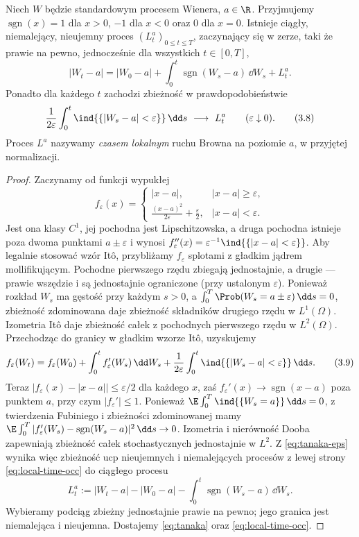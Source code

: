 \begin{twierdzenie}
\label{th:tanaka}
Niech $W$ będzie standardowym procesem Wienera, $a\in\R$.
Przyjmujemy $\operatorname{sgn}(x)=1$ dla $x>0$,
$-1$ dla $x<0$ oraz $0$ dla $x=0$. Istnieje ciągły,
niemalejący, nieujemny proces $(L_t^a)_{0\le t\le T}$,
zaczynający się w zerze, taki że prawie na pewno,
jednocześnie dla wszystkich $t\in[0,T]$,
\[
|W_t-a|=|W_0-a|+\int_0^t\operatorname{sgn}(W_s-a)
\,\dd W_s+L_t^a.
\tag{3.7}\label{eq:tanaka}
\]
Ponadto dla każdego $t$ zachodzi zbieżność w
prawdopodobieństwie
\[
\frac1{2\varepsilon}\int_0^t
\ind{\{|W_s-a|<\varepsilon\}}\,\dd s
\ \longrightarrow\ L_t^a
\qquad(\varepsilon\downarrow0).
\tag{3.8}\label{eq:local-time-occ}
\]
Proces $L^a$ nazywamy \emph{czasem lokalnym} ruchu Browna
na poziomie $a$, w przyjętej normalizacji.
\end{twierdzenie}
\begin{proof}
Zaczynamy od funkcji wypukłej
\[
f_\varepsilon(x)=
\begin{cases}
|x-a|,&|x-a|\ge\varepsilon,\\
\displaystyle\frac{(x-a)^2}{2\varepsilon}+
\frac\varepsilon2,&|x-a|<\varepsilon.
\end{cases}
\]
Jest ona klasy $C^1$, jej pochodna jest Lipschitzowska,
a druga pochodna istnieje poza dwoma punktami
$a\pm\varepsilon$ i wynosi
$f_\varepsilon''(x)=\varepsilon^{-1}
\ind{\{|x-a|<\varepsilon\}}$.
Aby legalnie stosować wzór Itô, przybliżamy
$f_\varepsilon$ splotami z gładkim jądrem
mollifikującym. Pochodne pierwszego rzędu zbiegają
jednostajnie, a drugie — prawie wszędzie i są
jednostajnie ograniczone (przy ustalonym
$\varepsilon$). Ponieważ rozkład $W_s$ ma gęstość
przy każdym $s>0$, a $\int_0^T\Prob(W_s=a\pm\varepsilon)
\,\dd s=0$, zbieżność zdominowana daje
zbieżność składników drugiego rzędu w $L^1(\Omega)$.
Izometria Itô daje zbieżność całek z pochodnych
pierwszego rzędu w $L^2(\Omega)$.
Przechodząc do granicy w gładkim wzorze Itô, uzyskujemy
\[
f_\varepsilon(W_t)=f_\varepsilon(W_0)
+\int_0^t f_\varepsilon'(W_s)\,\dd W_s
+\frac1{2\varepsilon}\int_0^t
\ind{\{|W_s-a|<\varepsilon\}}\,\dd s.
\tag{3.9}\label{eq:tanaka-eps}
\]
Teraz $|f_\varepsilon(x)-|x-a||\le\varepsilon/2$ dla
każdego $x$, zaś $f_\varepsilon'(x)\to
\operatorname{sgn}(x-a)$ poza punktem $a$, przy czym
$|f_\varepsilon'|\le1$. Ponieważ
$\E\int_0^T\ind{\{W_s=a\}}\,\dd s=0$,
z twierdzenia Fubiniego i zbieżności zdominowanej
mamy
$\E\int_0^T|f_\varepsilon'(W_s)-
\operatorname{sgn}(W_s-a)|^2\,\dd s\to0$.
Izometria i nierówność Dooba zapewniają zbieżność
całek stochastycznych jednostajnie w $L^2$.
Z \eqref{eq:tanaka-eps} wynika więc zbieżność ucp
nieujemnych i niemalejących procesów z lewej strony
\eqref{eq:local-time-occ} do ciągłego procesu
\[
L_t^a:=|W_t-a|-|W_0-a|
-\int_0^t\operatorname{sgn}(W_s-a)\,\dd W_s.
\]
Wybieramy podciąg zbieżny jednostajnie prawie na pewno;
jego granica jest niemalejąca i nieujemna. Dostajemy
\eqref{eq:tanaka} oraz \eqref{eq:local-time-occ}.
\end{proof}

